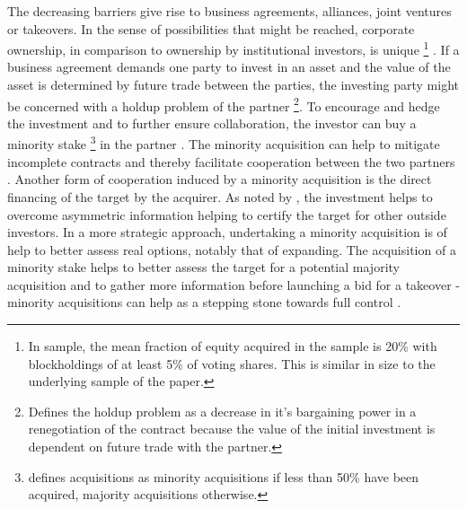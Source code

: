 \documentclass[12pt]{article}
\begin{document}
The decreasing barriers give rise to business agreements, alliances, joint ventures or takeovers. In the sense of possibilities that might be reached, corporate ownership, in comparison to ownership by institutional investors, is unique
	\footnote{In \citet{Allen2000} sample, the mean fraction of equity acquired in the sample is 20\% with blockholdings of at least 5\% of voting shares. This is similar in size to the underlying sample of the paper.}
\citep{Allen2000}.
If a business agreement demands one party to invest in an asset and the value of the asset is determined by future trade between the parties, the investing party might be concerned with a holdup problem of the partner 
	\footnote{\citet{Ouimet2013}Defines the holdup problem as a decrease in it's bargaining power in a renegotiation of the contract  because the value of the initial investment is dependent on future trade with the partner.}.   
To encourage and hedge the investment and to further ensure collaboration, the investor can buy a minority stake 
	\footnote{\citet{Ouimet2013} defines acquisitions as minority acquisitions if less than 50\% have been acquired, majority acquisitions otherwise.}
in the partner \citep{Ouimet2013}. The minority acquisition can help to mitigate incomplete contracts and thereby facilitate cooperation between the two partners \citep{Allen2000}. 
Another form of cooperation induced by a minority acquisition is the direct financing of the target by the acquirer. As noted by \citet{Ouimet2013}, the investment helps to overcome asymmetric information helping to certify the target for other outside investors.
In a more strategic approach, undertaking a minority acquisition is of help to better assess real options, notably that of expanding. The acquisition of a minority stake helps to better assess the target for a potential majority acquisition \citep{Ouimet2013} and to gather more information before launching a bid for a takeover \citep{Huang2017} - minority acquisitions can help as a stepping stone towards full control \citep{Huang2017}.
\end{document}
